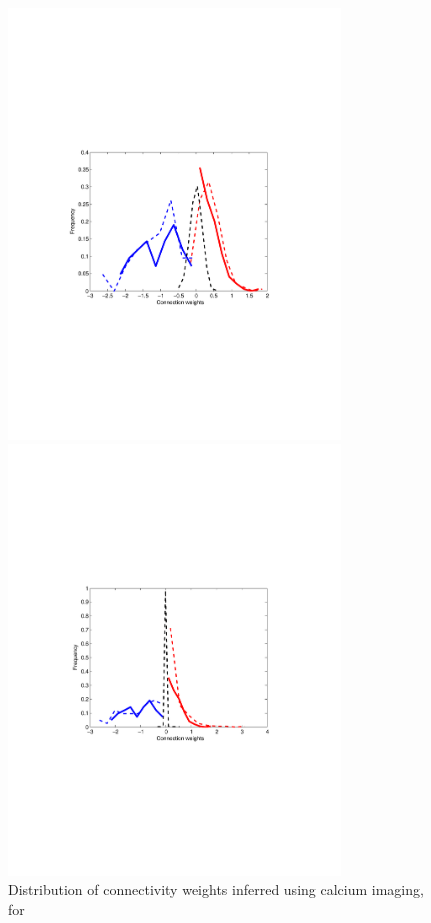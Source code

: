 \begin{figure}
\centering
\begin{minipage}[c]{0.45\hsize}
\includegraphics[width=250pt]{../figs/Figure5a_hist_glm_vanilla}
\end{minipage}
\begin{minipage}[c]{0.45\hsize}
\includegraphics[width=250pt]{../figs/Figure5b_hist_glm_sparse}
\end{minipage}
\caption{Distribution of connectivity weights inferred using calcium imaging, for
}
\end{figure}

